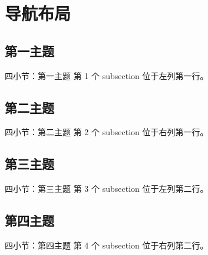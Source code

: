 \section{导航布局}
\subsection{第一主题}
\begin{frame}{四小节：第一主题}
  第 1 个 subsection 位于左列第一行。
\end{frame}
\subsection{第二主题}
\begin{frame}{四小节：第二主题}
  第 2 个 subsection 位于右列第一行。
\end{frame}
\subsection{第三主题}
\begin{frame}{四小节：第三主题}
  第 3 个 subsection 位于左列第二行。
\end{frame}
\subsection{第四主题}
\begin{frame}{四小节：第四主题}
  第 4 个 subsection 位于右列第二行。
\end{frame}
